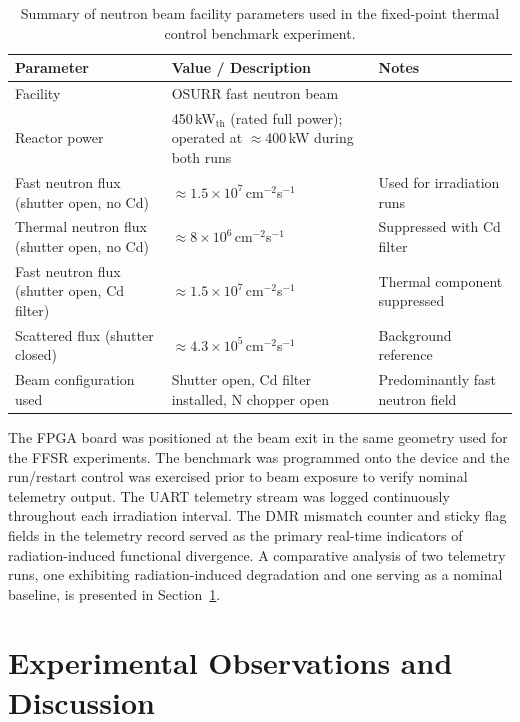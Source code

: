 \begin{table}[h!]
  \centering
  \caption{Summary of neutron beam facility parameters used in the
           fixed-point thermal control benchmark experiment.}
  \label{tab:bench_neutron}
  \renewcommand{\arraystretch}{1.25}
  \begin{tabular}{@{} p{5.5cm} p{5.5cm} p{2.5cm} @{}}
    \toprule
    \textbf{Parameter} & \textbf{Value / Description} & \textbf{Notes} \\
    \midrule
    Facility
      & OSURR fast neutron beam
      & \\
    Reactor power
      & 450\,kW$_{\mathrm{th}}$ (rated full power); operated at ${\approx}$400\,kW during both runs
      & \\
    Fast neutron flux (shutter open, no Cd)
      & ${\approx}1.5\times10^{7}$\,cm$^{-2}$s$^{-1}$
      & Used for irradiation runs \\
    Thermal neutron flux (shutter open, no Cd)
      & ${\approx}8\times10^{6}$\,cm$^{-2}$s$^{-1}$
      & Suppressed with Cd filter \\
    Fast neutron flux (shutter open, Cd filter)
      & ${\approx}1.5\times10^{7}$\,cm$^{-2}$s$^{-1}$
      & Thermal component suppressed \\
    Scattered flux (shutter closed)
      & ${\approx}4.3\times10^{5}$\,cm$^{-2}$s$^{-1}$
      & Background reference \\
    Beam configuration used
      & Shutter open, Cd filter installed, N chopper open
      & Predominantly fast neutron field \\
    \bottomrule
  \end{tabular}
\end{table}

The FPGA board was positioned at the beam exit in the same geometry used
for the FFSR experiments.  The benchmark was programmed onto the device
and the run/restart control was exercised prior to beam exposure to
verify nominal telemetry output.  The UART telemetry stream was logged
continuously throughout each irradiation interval.  The DMR mismatch
counter and sticky flag fields in the telemetry record served as the
primary real-time indicators of radiation-induced functional divergence.
A comparative analysis of two telemetry runs, one exhibiting
radiation-induced degradation and one serving as a nominal
baseline, is presented in Section~\ref{sec:bench_observations}.

\section{Experimental Observations and Discussion}
\label{sec:bench_observations}

